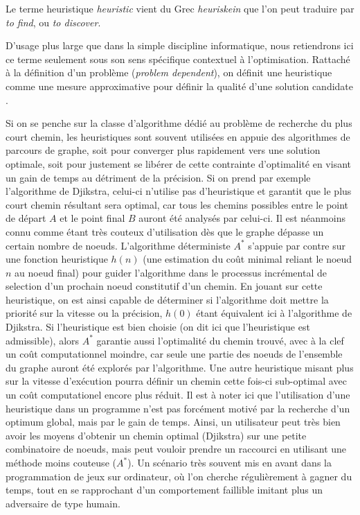 Le terme heuristique \textit{heuristic} vient du Grec \textit{heuriskein} que l'on peut traduire par \textit{to find}, ou \textit{to discover}. 

D'usage plus large que dans la simple discipline informatique, nous retiendrons ici ce terme seulement sous son sens spécifique contextuel à l'optimisation. Rattaché à la définition d'un problème (\textit{problem dependent}), on définit une heuristique comme une mesure approximative pour définir la qualité d'une solution candidate \autocite[34]{Weise2011}.

Si on se penche sur la classe d'algorithme dédié au problème de recherche du plus court chemin, les heuristiques sont souvent utilisées en appuie des algorithmes de parcours de graphe, soit pour converger plus rapidement vers une solution optimale, soit pour justement se libérer de cette contrainte d'optimalité en visant un gain de temps au détriment de la précision. Si on prend par exemple l'algorithme de Djikstra, celui-ci n'utilise pas d'heuristique et garantit que le plus court chemin résultant sera optimal, car tous les chemins possibles entre le point de départ $A$ et le point final $B$ auront été analysés par celui-ci. Il est néanmoins connu comme étant très couteux d'utilisation dès que le graphe dépasse un certain nombre de noeuds. L'algorithme déterministe $A^*$ s'appuie par contre sur une fonction heuristique $h(n)$ (une estimation du coût minimal reliant le noeud $n$ au noeud final) pour guider l'algorithme dans le processus incrémental de selection d'un prochain noeud constitutif d'un chemin. En jouant sur cette heuristique, on est ainsi capable de déterminer si l'algorithme doit mettre la priorité sur la vitesse ou la précision, $h(0)$ étant équivalent ici à l'algorithme de Djikstra. Si l'heuristique est bien choisie (on dit ici que l'heuristique est admissible), alors $A^*$ garantie aussi l'optimalité du chemin trouvé, avec à la clef un coût computationnel moindre, car seule une partie des noeuds de l'ensemble du graphe auront été explorés par l'algorithme. Une autre heuristique misant plus sur la vitesse d'exécution pourra définir un chemin cette fois-ci sub-optimal avec un coût computationel encore plus réduit. Il est à noter ici que l'utilisation d'une heuristique dans un programme n'est pas forcément motivé par la recherche d'un optimum global, mais par le gain de temps. Ainsi, un utilisateur peut très bien avoir les moyens d'obtenir un chemin optimal (Djikstra) sur une petite combinatoire de noeuds, mais peut vouloir prendre un raccourci en utilisant une méthode moins couteuse ($A^*$). Un scénario très souvent mis en avant dans la programmation de jeux sur ordinateur, où l'on cherche régulièrement à gagner du temps, tout en se rapprochant d'un comportement faillible imitant plus un adversaire de type humain.

